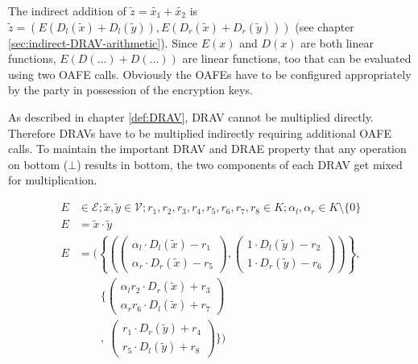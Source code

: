 The indirect addition of $\widetilde{z} = \widetilde{x_1} + \widetilde{x_2}$ is
$\widetilde{z} =
\left( E\left(D_l(\widetilde{x}) + D_l(\widetilde{y})\right),
       E\left(D_r(\widetilde{x}) + D_r(\widetilde{y})\right)
\right)$
(see chapter \ref{sec:indirect-DRAV-arithmetic}).
Since $E(x)$ and $D(x)$ are both linear functions, $E\left(D(\ldots)
+D(\ldots)\right)$ are linear functions, too that can be evaluated using two
OAFE calls.  Obviously the OAFEs have to be configured appropriately by the
party in possession of the encryption keys.


\label{sec:DRAE-multiplication}

As described in chapter \ref{def:DRAV}, DRAV cannot be multiplied directly.
Therefore DRAVs have to be multiplied indirectly requiring additional OAFE
calls. To maintain the important DRAV and DRAE property that any operation on
bottom ($\bot$) results in bottom, the two components of each DRAV get mixed for
multiplication.




\begin{align*}
  E & \in \mathcal{E}; \widetilde{x}, \widetilde{y} \in \mathcal{V};
  r_1, r_2, r_3, r_4, r_5, r_6, r_7, r_8 \in K;
  \alpha_l, \alpha_r \in K \setminus \{0\} \\
  E & = \widetilde{x} \cdot \widetilde{y} \\
  E & = \Bigg(\left\{\left(
            \begin{pmatrix}
              \alpha_l \cdot D_l(\widetilde{x}) - r_1 \\
              \alpha_r \cdot D_r(\widetilde{x}) - r_5
            \end{pmatrix},
            \begin{pmatrix}
              1        \cdot D_l(\widetilde{y}) - r_2 \\
              1        \cdot D_r(\widetilde{y}) - r_6
            \end{pmatrix}
        \right)\right\}, \\
    &   \qquad\bigg\{
        \begin{pmatrix}
            \alpha_lr_2 \cdot D_r(\widetilde{x}) + r_3 \\
            \alpha_rr_6 \cdot D_l(\widetilde{x}) + r_7
          \end{pmatrix} \\
    &  \qquad,
        \ \begin{pmatrix}
            r_1        \cdot D_r(\widetilde{y}) + r_4 \\
            r_5        \cdot D_l(\widetilde{y}) + r_8
          \end{pmatrix}
        \bigg\}\Bigg) \\
\end{align*}

